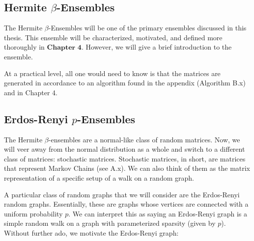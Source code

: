 % 
% 
% 
% 

\subsection{Hermite $\beta$-Ensembles}

The Hermite $\beta$-Ensembles will be one of the primary ensembles discussed in this thesis. This ensemble will be characterized, motivated, and defined more thoroughly in $\textbf{Chapter 4}$. However, we will give a brief introduction to the ensemble.

At a practical level, all one would need to know is that the matrices are generated in accordance to an algorithm found in the appendix (Algorithm B.x) and in Chapter 4. 

\subsection{Erdos-Renyi $p$-Ensembles}

The Hermite $\beta$-ensembles are a normal-like class of random matrices. Now, we will veer away from the normal distribution as a whole and switch to a different class of matrices: stochastic matrices. Stochastic matrices, in short, are matrices that represent Markov Chains (see A.x). We can also think of them as the matrix representation of a specific setup of a walk on a random graph. 

A particular class of random graphs that we will consider are the Erdos-Renyi random graphs. Essentially, these are graphs whose vertices are connected with a uniform probability $p$. We can interpret this as saying an Erdos-Renyi graph is a simple random walk on a graph with parameterized sparsity (given by $p$). Without further ado, we motivate the Erdos-Renyi graph:

